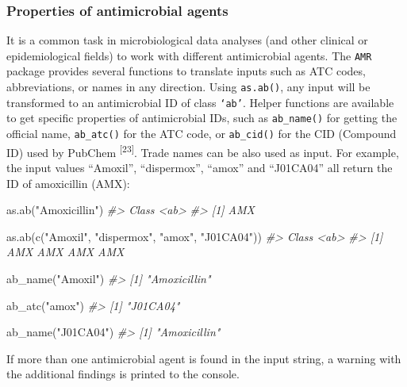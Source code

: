 \documentclass[
]{book}
\newenvironment{Shaded}{\begin{snugshade}}{\end{snugshade}}
\newcommand{\CommentTok}[1]{\textcolor[rgb]{0.56,0.35,0.01}{\textit{#1}}}
\newcommand{\FunctionTok}[1]{\textcolor[rgb]{0.00,0.00,0.00}{#1}}
\newcommand{\NormalTok}[1]{#1}
\newcommand{\StringTok}[1]{\textcolor[rgb]{0.31,0.60,0.02}{#1}}
\begin{document}
\hypertarget{properties-of-antimicrobial-agents}{%
\subsubsection{Properties of antimicrobial agents}\label{properties-of-antimicrobial-agents}}

It is a common task in microbiological data analyses (and other clinical or epidemiological fields) to work with different antimicrobial agents. The \texttt{AMR} package provides several functions to translate inputs such as ATC codes, abbreviations, or names in any direction. Using \texttt{as.ab()}, any input will be transformed to an antimicrobial ID of class \texttt{‘ab’}. Helper functions are available to get specific properties of antimicrobial IDs, such as \texttt{ab\_name()} for getting the official name, \texttt{ab\_atc()} for the ATC code, or \texttt{ab\_cid()} for the CID (Compound ID) used by PubChem \textsuperscript{{[}23{]}}. Trade names can be also used as input. For example, the input values ``Amoxil'', ``dispermox'', ``amox'' and ``J01CA04'' all return the ID of amoxicillin (AMX):

\begin{Shaded}
\begin{Highlighting}[]
\FunctionTok{as.ab}\NormalTok{(}\StringTok{"Amoxicillin"}\NormalTok{)}
\CommentTok{\#\textgreater{} Class \textless{}ab\textgreater{}}
\CommentTok{\#\textgreater{} [1] AMX}

\FunctionTok{as.ab}\NormalTok{(}\FunctionTok{c}\NormalTok{(}\StringTok{"Amoxil"}\NormalTok{, }\StringTok{"dispermox"}\NormalTok{, }\StringTok{"amox"}\NormalTok{, }\StringTok{"J01CA04"}\NormalTok{))}
\CommentTok{\#\textgreater{} Class \textless{}ab\textgreater{}}
\CommentTok{\#\textgreater{} [1] AMX AMX AMX AMX}

\FunctionTok{ab\_name}\NormalTok{(}\StringTok{"Amoxil"}\NormalTok{)}
\CommentTok{\#\textgreater{} [1] "Amoxicillin" }

\FunctionTok{ab\_atc}\NormalTok{(}\StringTok{"amox"}\NormalTok{)}
\CommentTok{\#\textgreater{} [1] "J01CA04"}

\FunctionTok{ab\_name}\NormalTok{(}\StringTok{"J01CA04"}\NormalTok{)}
\CommentTok{\#\textgreater{} [1] "Amoxicillin"}
\end{Highlighting}
\end{Shaded}

If more than one antimicrobial agent is found in the input string, a warning with the additional findings is printed to the console.
\end{document}
